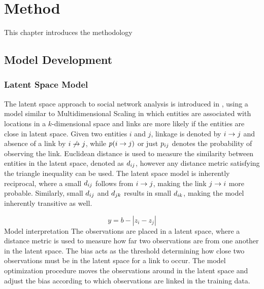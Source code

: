 
\chapter{Method}\label{ch:Method}

This chapter introduces the methodology 

\section{Model Development}

    \subsection{Latent Space Model}
    
        The latent space approach to social network analysis is introduced in \cite{hoff2002latent}, using a model similar to Multidimensional Scaling in which entities are associated with locations in a $k$-dimensional space and links are more likely if the entities are close in latent space.
        Given two entities $i$ and $j$, linkage is denoted by $\link$ and absence of a link by $\link*$, while $p(\link)$ or just $\sub(p)$ denotes the probability of observing the link. 
        Euclidean distance is used to measure the similarity between entities in the latent space, denoted as $\sub(d)$, however any distance metric satisfying the triangle inequality can be used.
        The latent space model is inherently reciprocal, where a small $\sub(d)$ follows from $\link$, making the link $\link(j)(i)$ more probable. Similarly, small $\sub(d)$ and $\sub(d)(jk)$ results in small $\sub(d)(ik)$, making the model inherently transitive as well.
        
        
        
        \[ y = b - |z_i - z_j| \]
        Model interpretation
            The observations are placed in a latent space, where a distance metric is used to measure how far two observations are from one another in the latent space. The bias acts as the threshold determining how close two observations must be in the latent space for a link to occur. The model optimization procedure moves the observations around in the latent space and adjust the bias according to which observations are linked in the training data.
        
